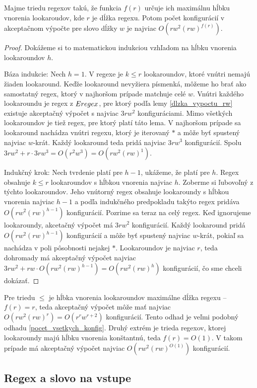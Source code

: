 \begin{lema}\label{lema_hlbka_lookaroundov}
Majme triedu regexov takú, že funkcia $f(r)$ určuje ich maximálnu hĺbku vnorenia lookaroudov, kde $r$ je dĺžka regexu. Potom počet konfigurácií v akceptačnom výpočte pre slovo dĺžky $w$ je najviac $O(rw^2(rw)^{f(r)})$.
\end{lema}
\begin{proof}
Dokážeme si to matematickou indukciou vzhľadom na hĺbku vnorenia lookaroundov $h$.

Báza indukcie: Nech $h=1$. V regexe je $k\leq r$ lookaroundov, ktoré vnútri nemajú žiaden lookaround. Keďže lookaround nevyžiera písmenká, môžeme ho brať ako samostatný regex, ktorý v najhoršom prípade matchuje celé $w$. Vnútri každého lookaroundu je regex z $Eregex$, pre ktorý podľa lemy \ref{dlzka_vypoctu_rw} existuje akceptačný výpočet s najviac $3rw^2$ konfiguráciami. Mimo všetkých lookaroundov je tiež regex, pre ktorý platí táto lema. V najhoršom prípade sa lookaround nachádza vnútri regexu, ktorý je iterovaný $*$ a môže byť spustený najviac $w$-krát. Každý lookaround teda pridá najviac $3rw^3$ konfigurácií. Spolu $3rw^2+r\cdot 3rw^3 = O(r^2w^3) = O(rw^2(rw)^1)$. 

Indukčný krok: Nech tvrdenie platí pre $h-1$, ukážeme, že platí pre $h$. Regex obsahuje $k\leq r$ lookaroundov s hĺbkou vnorenia najviac $h$. Zoberme si ľubovoľný z týchto lookaroundov. Jeho vnútorný regex obsahuje lookaroundy s hĺbkou vnorenia najviac $h-1$ a podľa indukčného predpokladu takýto regex pridáva $O(rw^2(rw)^{h-1})$ konfigurácií. Pozrime sa teraz na celý regex. Keď ignorujeme lookaroundy, akcetačný výpočet má $3rw^2$ konfigurácií. Každý lookaround pridá $O(rw^2(rw)^{h-1})$ konfigurácií a môže byť spustený najviac $w$-krát, pokiaľ sa nachádza v poli pôsobnosti nejakej $*$. Lookaroundov je najviac $r$, teda dohromady má akceptačný výpočet najviac $3rw^2+rw\cdot O(rw^2(rw)^{h-1}) = O(rw^2(rw)^h)$ konfigurácií, čo sme chceli dokázať.
\end{proof}

Pre triedu $\le$ je hĺbka vnorenia lookaroundov maximálne dĺžka regexu -- $f(r)=r$, teda akceptačný výpočet môže mať najviac $O(rw^2(rw)^r) = O(r^rw^{r+2})$ konfigurácií. Tento odhad je veľmi podobný odhadu \ref{pocet_vsetkych_konfig}. Druhý extrém je trieda regexov, ktorej lookaroundy majú hĺbku vnorenia konštantnú, teda $f(r)=O(1)$. V takom prípade má akceptačný výpočet najviac $O(rw^2(rw)^{O(1)})$ konfigurácií.

\subsection{Regex a slovo na vstupe}

